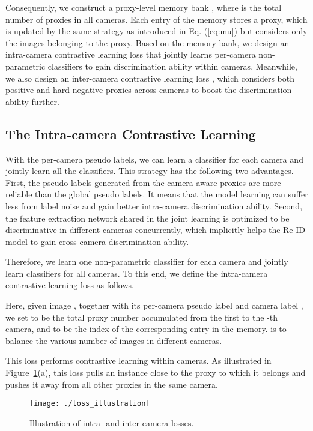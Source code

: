\documentclass[letterpaper]{article} \usepackage{aaai21}  \usepackage{times}  \usepackage{helvet} \usepackage{courier}  \usepackage[hyphens]{url}  \usepackage{graphicx} \usepackage{subcaption}
\begin{document}
Consequently, we construct a proxy-level memory bank , where  is the total number of proxies in all cameras. Each entry of the memory stores a proxy, which is updated by the same strategy as introduced in Eq. (\ref{eq:mu}) but considers only the images belonging to the proxy. Based on the memory bank, we design an intra-camera contrastive learning loss  that jointly learns per-camera non-parametric classifiers to gain discrimination ability within cameras. Meanwhile, we also design an inter-camera contrastive learning loss , which considers both positive and hard negative proxies across cameras to boost the discrimination ability further.  


\subsection{The Intra-camera Contrastive Learning}
With the per-camera pseudo labels, we can learn a classifier for each camera and jointly learn all the classifiers. This strategy has the following two advantages. First, the pseudo labels generated from the camera-aware proxies are more reliable than the global pseudo labels. It means that the model learning can suffer less from label noise and gain better intra-camera discrimination ability. Second, the feature extraction network shared in the joint learning is optimized to be discriminative in different cameras concurrently, which implicitly helps the Re-ID model to gain cross-camera discrimination ability. 

Therefore, we learn one non-parametric classifier for each camera and jointly learn classifiers for all cameras. To this end, we define the intra-camera contrastive learning loss as follows.

Here, given image , together with its per-camera pseudo label  and camera label , we set  to be the total proxy number accumulated from the first to the -th camera, and  to be the index of the corresponding entry in the memory.  is to balance the various number of images in different cameras. 

This loss performs contrastive learning within cameras. As illustrated in Figure~\ref{fig_loss}(a), this loss pulls an instance close to the proxy to which it belongs and pushes it away from all other proxies in the same camera. 


\begin{figure}[t]
\centering
\texttt{[image: ./loss\_illustration]}
\caption{Illustration of intra- and inter-camera losses.}
\label{fig_loss}
\end{figure}
\end{document}
